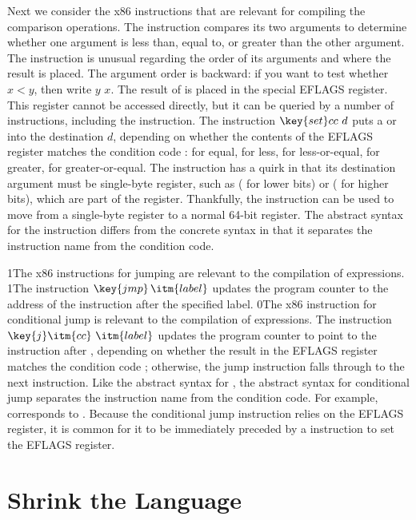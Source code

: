 \documentclass[7x10]{TimesAPriori_MIT}%
\def\racketEd{0}
\def\pythonEd{1}
\def\edition{0}
\newcommand{\racket}[1]{{\if\edition\racketEd{#1}\fi}}
\newcommand{\python}[1]{{\if\edition\pythonEd #1\fi}}
\numberwithin{theorem}{chapter}
\numberwithin{definition}{chapter}
\numberwithin{equation}{chapter}
\begin{document}
Next we consider the x86 instructions that are relevant for compiling
the comparison operations. The  instruction compares its two
arguments to determine whether one argument is less than, equal to, or
greater than the other argument. The  instruction is unusual
regarding the order of its arguments and where the result is
placed. The argument order is backward: if you want to test whether
$x < y$, then write  $y$\code{,} $x$. The result of
 is placed in the special EFLAGS register. This register
cannot be accessed directly, but it can be queried by a number of
instructions, including the  instruction. The instruction
$\key{set}cc~d$ puts a  or  into the destination $d$,
depending on whether the contents of the EFLAGS register matches the
condition code :  for equal,  for less, 
for less-or-equal,  for greater,  for greater-or-equal.
The  instruction has a quirk in that its destination argument
must be single-byte register, such as  ( for lower bits) or
 ( for higher bits), which are part of the 
register.  Thankfully, the  instruction can be used to
move from a single-byte register to a normal 64-bit register.  The
abstract syntax for the  instruction differs from the
concrete syntax in that it separates the instruction name from the
condition code.

\python{The x86 instructions for jumping are relevant to the
  compilation of \key{if} expressions.}
%
\python{The instruction $\key{jmp}\,\itm{label}$ updates the program
  counter to the address of the instruction after the specified
  label.}
%
\racket{The x86 instruction for conditional jump is relevant to the
  compilation of \key{if} expressions.}
%
The instruction $\key{j}\itm{cc}~\itm{label}$ updates the program
counter to point to the instruction after , depending on
whether the result in the EFLAGS register matches the condition code
; otherwise, the jump instruction falls through to the next
instruction.  Like the abstract syntax for , the abstract
syntax for conditional jump separates the instruction name from the
condition code. For example, 
corresponds to .  Because the conditional jump instruction
relies on the EFLAGS register, it is common for it to be immediately preceded by
a  instruction to set the EFLAGS register.


\section{Shrink the \LangIf{} Language}
\label{sec:shrink-Lif}
\end{document}
